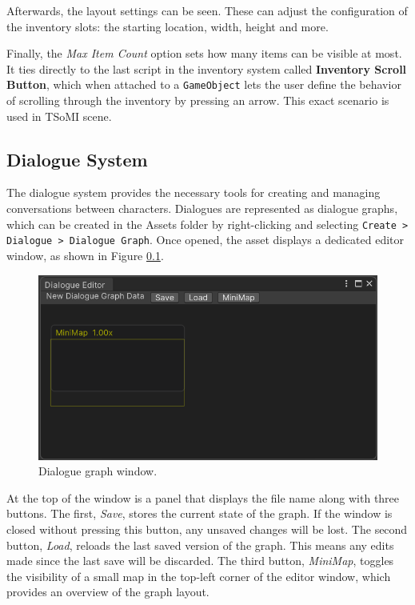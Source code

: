 Afterwards, the layout settings can be seen. These can adjust the configuration of the inventory slots: the starting location, width, height and more. 

Finally, the \textit{Max Item Count} option sets how many items can be visible at most. It ties directly to the last script in the inventory system called \textbf{Inventory Scroll Button}, which when attached to a \verb|GameObject| lets the user define the behavior of scrolling through the inventory by pressing an arrow. This exact scenario is used in TSoMI scene.

\subsection{Dialogue System}
The dialogue system provides the necessary tools for creating and managing conversations between characters. Dialogues are represented as dialogue graphs, which can be created in the Assets folder by right-clicking and selecting \verb|Create > Dialogue > Dialogue Graph|. Once opened, the asset displays a dedicated editor window, as shown in Figure \ref{}.

\begin{figure}[H]
\centering
\includegraphics[width=0.8\linewidth]{img/User doc/image_2025-07-04_123651622.png}
\caption{Dialogue graph window.}
\label{fig:Manual-DW}
\end{figure}

At the top of the window is a panel that displays the file name along with three buttons. The first, \textit{Save}, stores the current state of the graph. If the window is closed without pressing this button, any unsaved changes will be lost. The second button, \textit{Load}, reloads the last saved version of the graph. This means any edits made since the last save will be discarded. The third button, \textit{MiniMap}, toggles the visibility of a small map in the top-left corner of the editor window, which provides an overview of the graph layout.

